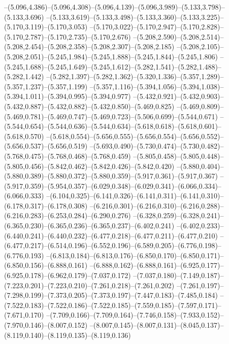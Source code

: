   --(5.096,4.386)--(5.096,4.308)--(5.096,4.139)--(5.096,3.989)--(5.133,3.798)--(5.133,3.696)%
  --(5.133,3.619)--(5.133,3.498)--(5.133,3.360)--(5.133,3.225)--(5.170,3.119)--(5.170,3.053)%
  --(5.170,3.022)--(5.170,2.947)--(5.170,2.828)--(5.170,2.787)--(5.170,2.735)--(5.170,2.676)%
  --(5.208,2.590)--(5.208,2.514)--(5.208,2.454)--(5.208,2.358)--(5.208,2.307)--(5.208,2.185)%
  --(5.208,2.105)--(5.208,2.051)--(5.245,1.984)--(5.245,1.888)--(5.245,1.844)--(5.245,1.806)%
  --(5.245,1.688)--(5.245,1.649)--(5.245,1.612)--(5.282,1.541)--(5.282,1.488)--(5.282,1.442)%
  --(5.282,1.397)--(5.282,1.362)--(5.320,1.336)--(5.357,1.289)--(5.357,1.237)--(5.357,1.199)%
  --(5.357,1.116)--(5.394,1.056)--(5.394,1.038)--(5.394,1.011)--(5.394,0.995)--(5.394,0.977)%
  --(5.432,0.921)--(5.432,0.903)--(5.432,0.887)--(5.432,0.882)--(5.432,0.850)--(5.469,0.825)%
  --(5.469,0.809)--(5.469,0.781)--(5.469,0.747)--(5.469,0.723)--(5.506,0.699)--(5.544,0.671)%
  --(5.544,0.654)--(5.544,0.636)--(5.544,0.634)--(5.618,0.618)--(5.618,0.601)--(5.618,0.570)%
  --(5.618,0.554)--(5.656,0.555)--(5.656,0.554)--(5.656,0.552)--(5.656,0.537)--(5.656,0.519)%
  --(5.693,0.490)--(5.730,0.474)--(5.730,0.482)--(5.768,0.475)--(5.768,0.468)--(5.768,0.459)%
  --(5.805,0.458)--(5.805,0.448)--(5.805,0.456)--(5.842,0.462)--(5.842,0.426)--(5.842,0.420)%
  --(5.880,0.404)--(5.880,0.389)--(5.880,0.372)--(5.880,0.359)--(5.917,0.361)--(5.917,0.367)%
  --(5.917,0.359)--(5.954,0.357)--(6.029,0.348)--(6.029,0.341)--(6.066,0.334)--(6.066,0.333)%
  --(6.104,0.325)--(6.141,0.326)--(6.141,0.311)--(6.141,0.310)--(6.178,0.317)--(6.178,0.308)%
  --(6.216,0.301)--(6.216,0.310)--(6.216,0.288)--(6.216,0.283)--(6.253,0.284)--(6.290,0.276)%
  --(6.328,0.259)--(6.328,0.241)--(6.365,0.230)--(6.365,0.236)--(6.365,0.237)--(6.402,0.241)%
  --(6.402,0.233)--(6.440,0.241)--(6.440,0.232)--(6.477,0.218)--(6.477,0.211)--(6.477,0.210)%
  --(6.477,0.217)--(6.514,0.196)--(6.552,0.196)--(6.589,0.205)--(6.776,0.198)--(6.776,0.193)%
  --(6.813,0.184)--(6.813,0.176)--(6.850,0.170)--(6.850,0.171)--(6.850,0.156)--(6.888,0.161)%
  --(6.888,0.162)--(6.888,0.161)--(6.925,0.177)--(6.925,0.178)--(6.962,0.179)--(7.037,0.172)%
  --(7.037,0.180)--(7.149,0.187)--(7.223,0.201)--(7.223,0.210)--(7.261,0.218)--(7.261,0.202)%
  --(7.261,0.197)--(7.298,0.199)--(7.373,0.205)--(7.373,0.197)--(7.447,0.183)--(7.485,0.184)%
  --(7.522,0.183)--(7.522,0.186)--(7.522,0.185)--(7.559,0.185)--(7.597,0.171)--(7.671,0.170)%
  --(7.709,0.166)--(7.709,0.164)--(7.746,0.158)--(7.933,0.152)--(7.970,0.146)--(8.007,0.152)%
  --(8.007,0.145)--(8.007,0.131)--(8.045,0.137)--(8.119,0.140)--(8.119,0.135)--(8.119,0.136)%
